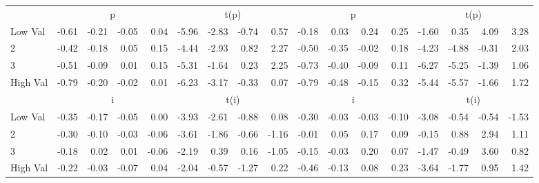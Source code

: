 \begin{tabular}{lrrrrrrrrrrrrrrrr}
  
    
      & \multicolumn{4}{c}{p} & \multicolumn{4}{c}{t(p)}
    
      & \multicolumn{4}{c}{p} & \multicolumn{4}{c}{t(p)}
    
    \\
      \cmidrule(r){2-5} \cmidrule(r){6-9} \cmidrule(r){10-13} \cmidrule(r){14-17}

    Low Val   & -0.61  & -0.21  & -0.05  & 0.04  & -5.96  & -2.83  & -0.74  & 0.57  & -0.18  & 0.03  & 0.24  & 0.25  & -1.60  & 0.35  & 4.09  & 3.28  \\
           2  & -0.42  & -0.18  & 0.05  & 0.15  & -4.44  & -2.93  & 0.82  & 2.27  & -0.50  & -0.35  & -0.02  & 0.18  & -4.23  & -4.88  & -0.31  & 2.03  \\
           3  & -0.51  & -0.09  & 0.01  & 0.15  & -5.31  & -1.64  & 0.23  & 2.25  & -0.73  & -0.40  & -0.09  & 0.11  & -6.27  & -5.25  & -1.39  & 1.06  \\
    High Val  & -0.79  & -0.20  & -0.02  & 0.01  & -6.23  & -3.17  & -0.33  & 0.07  & -0.79  & -0.48  & -0.15  & 0.32  & -5.44  & -5.57  & -1.66  & 1.72  \\

  
    
      & \multicolumn{4}{c}{i} & \multicolumn{4}{c}{t(i)}
    
      & \multicolumn{4}{c}{i} & \multicolumn{4}{c}{t(i)}
    
    \\
      \cmidrule(r){2-5} \cmidrule(r){6-9} \cmidrule(r){10-13} \cmidrule(r){14-17}

    Low Val   & -0.35  & -0.17  & -0.05  & 0.00  & -3.93  & -2.61  & -0.88  & 0.08  & -0.30  & -0.03  & -0.03  & -0.10  & -3.08  & -0.54  & -0.54  & -1.53  \\
           2  & -0.30  & -0.10  & -0.03  & -0.06  & -3.61  & -1.86  & -0.66  & -1.16  & -0.01  & 0.05  & 0.17  & 0.09  & -0.15  & 0.88  & 2.94  & 1.11  \\
           3  & -0.18  & 0.02  & 0.01  & -0.06  & -2.19  & 0.39  & 0.16  & -1.05  & -0.15  & -0.03  & 0.20  & 0.07  & -1.47  & -0.49  & 3.60  & 0.82  \\
    High Val  & -0.22  & -0.03  & -0.07  & 0.04  & -2.04  & -0.57  & -1.27  & 0.22  & -0.46  & -0.13  & 0.08  & 0.23  & -3.64  & -1.77  & 0.95  & 1.42  \\

  

  \bottomrule
\end{tabular}
